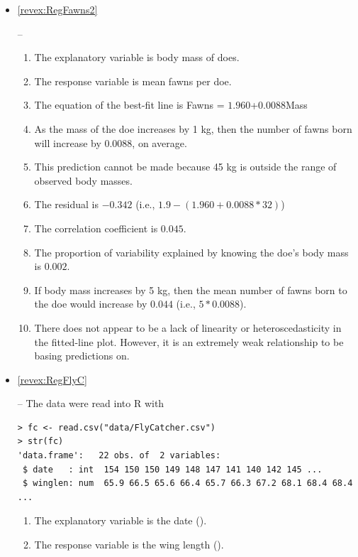 \documentclass[10pt,openany]{book}\usepackage[]{graphicx}\usepackage[]{color}
\makeatletter
\newenvironment{kframe}{%
 \def\at@end@of@kframe{}%
 \ifinner\ifhmode%
  \def\at@end@of@kframe{\end{minipage}}%
  \begin{minipage}{\columnwidth}%
 \fi\fi%
 \def\FrameCommand##1{\hskip\@totalleftmargin \hskip-\fboxsep
 \colorbox{shadecolor}{##1}\hskip-\fboxsep
     \hskip-\linewidth \hskip-\@totalleftmargin \hskip\columnwidth}%
 \MakeFramed {\advance\hsize-\width
   \@totalleftmargin\z@ \linewidth\hsize
   \@setminipage}}%
 {\par\unskip\endMakeFramed%
 \at@end@of@kframe}
\newenvironment{knitrout}{}{} %
\makeatother
\begin{document}
\begin{itemize}
  \item \hypertarget{ans:RegFawns2}{\ref{revex:RegFawns2}} --
    \begin{enumerate}
      \item The explanatory variable is body mass of does.
      \item The response variable is mean fawns per doe.
      \item The equation of the best-fit line is Fawns = $1.960$+$0.0088$Mass
      \item As the mass of the doe increases by 1 kg, then the number of fawns born will increase by 0.0088, on average.
      \item This prediction cannot be made because 45 kg is outside the range of observed body masses.
      \item The residual is $-0.342$ (i.e., $1.9-(1.960+0.0088*32)$)
      \item The correlation coefficient is $0.045$.
      \item The proportion of variability explained by knowing the doe's body mass is $0.002$.
      \item If body mass increases by 5 kg, then the mean number of fawns born to the doe would increase by $0.044$ (i.e., $5*0.0088$).
      \item There does not appear to be a lack of linearity or heteroscedasticity in the fitted-line plot.  However, it is an extremely weak relationship to be basing predictions on.
    \end{enumerate}

  \item \hypertarget{ans:RegFlyC}{\ref{revex:RegFlyC}} --  The data were read into R with
\begin{knitrout}
\color{fgcolor}\begin{kframe}
\begin{verbatim}
> fc <- read.csv("data/FlyCatcher.csv")
> str(fc)
'data.frame':	22 obs. of  2 variables:
 $ date   : int  154 150 150 149 148 147 141 140 142 145 ...
 $ winglen: num  65.9 66.5 65.6 66.4 65.7 66.3 67.2 68.1 68.4 68.4 ...
\end{verbatim}
\end{kframe}
\end{knitrout}
    \begin{enumerate}
      \item The explanatory variable is the date ().
      \item The response variable is the wing length ().


\end{enumerate}
\end{itemize}
\end{document}
